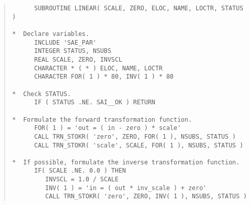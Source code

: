 \documentclass[twoside,11pt]{article}
\newcommand{\numcir}[1]{\mbox{\hspace{3ex}\fbox{#1}}}
\begin{document}
\begin{quote}
\begin{tabbing} %

\verb#      SUBROUTINE LINEAR( SCALE, ZERO, ELOC, NAME, LOCTR, STATUS )#\\
\verb#                                                       #\\
\verb#*  Declare variables.                                  #\\
\verb#      INCLUDE 'SAE_PAR'                                #\\
\verb#      INTEGER STATUS, NSUBS                            #\\
\verb#      REAL SCALE, ZERO, INVSCL                         #\\
\verb#      CHARACTER * ( * ) ELOC, NAME, LOCTR              #\\
\verb#      CHARACTER FOR( 1 ) * 80, INV( 1 ) * 80           #\\
\verb#                                                       #\\
\verb#*  Check STATUS.                                       #\\
\verb#      IF ( STATUS .NE. SAI__OK ) RETURN                #\\
\verb#                                                       #\\
\verb#*  Formulate the forward transformation function.      #\\
\verb#      FOR( 1 ) = 'out = ( in - zero ) * scale'         #\numcir{1}\\
\verb#      CALL TRN_STOKR( 'zero', ZERO, FOR( 1 ), NSUBS, STATUS )#\\
\verb#      CALL TRN_STOKR( 'scale', SCALE, FOR( 1 ), NSUBS, STATUS )#\\
\verb#                                                       #\\
\verb#*  If possible, formulate the inverse transformation function.#\\
\verb#      IF( SCALE .NE. 0.0 ) THEN                        #\\
\verb#         INVSCL = 1.0 / SCALE                          #\\
\verb#         INV( 1 ) = 'in = ( out * inv_scale ) + zero'  #\numcir{2}\\
\verb#         CALL TRN_STOKR( 'zero', ZERO, INV( 1 ), NSUBS, STATUS )#\\

\end{tabbing}
\end{quote}
\end{document}
